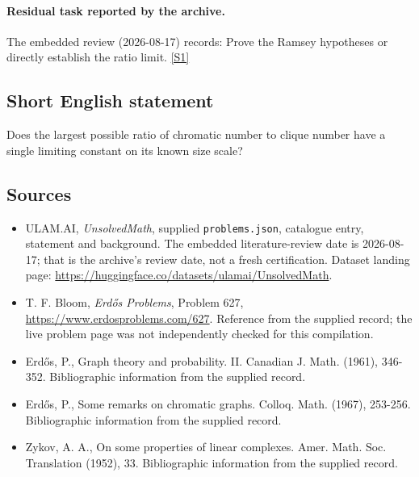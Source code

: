 \documentclass[11pt,a4paper]{article}
\newcommand{\sref}[2]{\hyperlink{source:#1:#2}{[S#2]}}
\begin{document}
\paragraph{Residual task reported by the archive.}

The embedded review (2026-08-17) records: Prove the Ramsey hypotheses or directly establish the ratio limit. \sref{statement}{1}

\subsection{Short English statement}

Does the largest possible ratio of chromatic number to clique number have a single limiting constant on its known size scale?

\subsection{Sources}

{\small

\begin{itemize}

\item[\hypertarget{source:statement:1}{S1}] ULAM.AI, \emph{UnsolvedMath}, supplied \texttt{problems.json}, catalogue entry, statement and background. The embedded literature-review date is 2026-08-17; that is the archive’s review date, not a fresh certification. Dataset landing page: \url{https://huggingface.co/datasets/ulamai/UnsolvedMath}.

\item[\hypertarget{source:statement:2}{S2}] T. F. Bloom, \emph{Erdős Problems}, Problem 627, \url{https://www.erdosproblems.com/627}. Reference from the supplied record; the live problem page was not independently checked for this compilation.

\item[\hypertarget{source:statement:3}{S3}] Erd\H{o}s, P., Graph theory and probability. II. Canadian J. Math. (1961), 346-352. Bibliographic information from the supplied record.

\item[\hypertarget{source:statement:4}{S4}] Erd\H{o}s, P., Some remarks on chromatic graphs. Colloq. Math. (1967), 253-256. Bibliographic information from the supplied record.

\item[\hypertarget{source:statement:5}{S5}] Zykov, A. A., On some properties of linear complexes. Amer. Math. Soc. Translation (1952), 33. Bibliographic information from the supplied record.

\end{itemize}

}

\label{end:statement}
\end{document}
